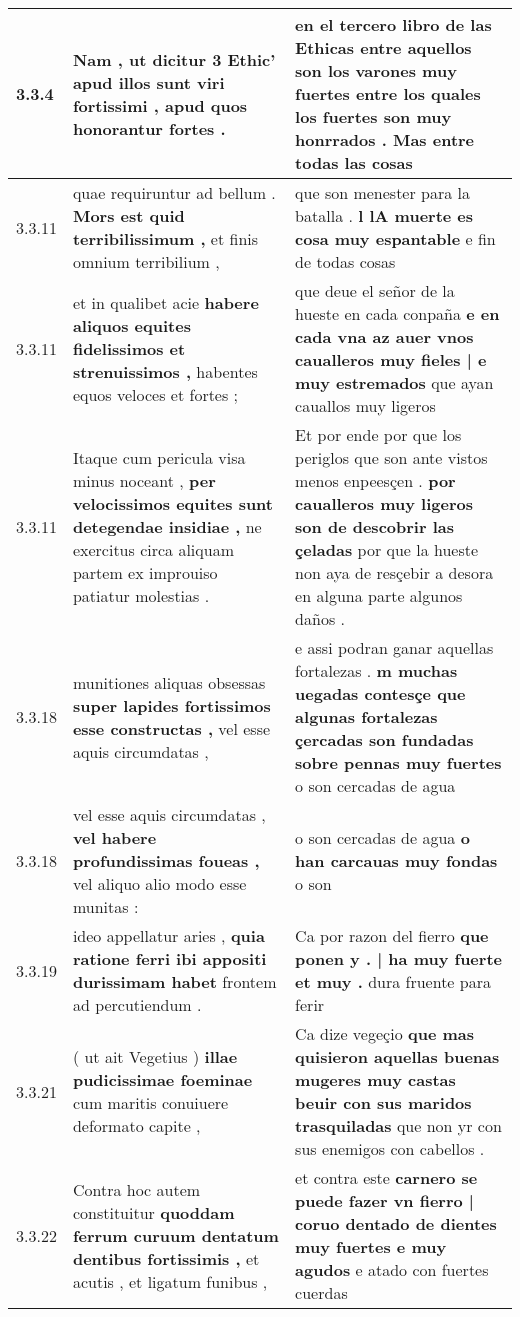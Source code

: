 \begin{tabular}{|p{1cm}|p{6.5cm}|p{6.5cm}|}
3.3.4 & Nam , ut dicitur 3 Ethic’ \textbf{ apud illos sunt viri fortissimi , } apud quos honorantur fortes . & en el tercero libro de las Ethicas \textbf{ entre aquellos son los varones muy fuertes entre los quales los fuertes son muy honrrados . } Mas entre todas las cosas \\\hline
3.3.11 & quae requiruntur ad bellum . \textbf{ Mors est quid terribilissimum , } et finis omnium terribilium , & que son menester para la batalla . \textbf{ l lA muerte es cosa muy espantable } e fin de todas cosas \\\hline
3.3.11 & et in qualibet acie \textbf{ habere aliquos equites fidelissimos et strenuissimos , } habentes equos veloces et fortes ; & que deue el señor de la hueste en cada conpaña \textbf{ e en cada vna az auer vnos caualleros muy fieles | e muy estremados } que ayan cauallos muy ligeros \\\hline
3.3.11 & Itaque cum pericula visa minus noceant , \textbf{ per velocissimos equites sunt detegendae insidiae , } ne exercitus circa aliquam partem ex improuiso patiatur molestias . & Et por ende por que los periglos que son ante vistos menos enpeesçen . \textbf{ por caualleros muy ligeros son de descobrir las çeladas } por que la hueste non aya de resçebir a desora en alguna parte algunos daños . \\\hline
3.3.18 & munitiones aliquas obsessas \textbf{ super lapides fortissimos esse constructas , } vel esse aquis circumdatas , & e assi podran ganar aquellas fortalezas . \textbf{ m muchas uegadas contesçe que algunas fortalezas çercadas son fundadas sobre pennas muy fuertes } o son cercadas de agua \\\hline
3.3.18 & vel esse aquis circumdatas , \textbf{ vel habere profundissimas foueas , } vel aliquo alio modo esse munitas : & o son cercadas de agua \textbf{ o han carcauas muy fondas } o son \\\hline
3.3.19 & ideo appellatur aries , \textbf{ quia ratione ferri ibi appositi durissimam habet } frontem ad percutiendum . & Ca por razon del fierro \textbf{ que ponen y . | ha muy fuerte et muy . } dura fruente para ferir \\\hline
3.3.21 & ( ut ait Vegetius ) \textbf{ illae pudicissimae foeminae } cum maritis conuiuere deformato capite , & Ca dize vegeçio \textbf{ que mas quisieron aquellas buenas mugeres muy castas beuir con sus maridos trasquiladas } que non yr con sus enemigos con cabellos . \\\hline
3.3.22 & Contra hoc autem constituitur \textbf{ quoddam ferrum curuum dentatum dentibus fortissimis , } et acutis , et ligatum funibus , & et contra este \textbf{ carnero se puede fazer vn fierro | coruo dentado de dientes muy fuertes e muy agudos } e atado con fuertes cuerdas \\\hline

\end{tabular}
